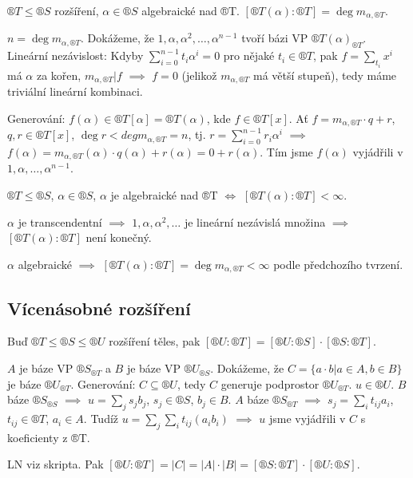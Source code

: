 \documentclass[12pt]{article}                   %
\begin{document}
        \begin{tvrzeni}
            $®T ≤ ®S$ rozšíření, $\alpha \in ®S$ algebraické nad ®T. $[®T(\alpha):®T] = \deg m_{\alpha, ®T}$.

            \begin{dukazin}
                $n = \deg m_{\alpha, ®T}$. Dokážeme, že $1, \alpha, \alpha^2, …, \alpha^{n-1}$ tvoří bázi VP $®T(\alpha)_{®T}$. Lineární nezávislost: Kdyby $\sum_{i=0}^{n-1}t_i\alpha^i = 0$ pro nějaké $t_i \in ®T$, pak $f = \sum_{t_i}x^i$ má $\alpha$ za kořen, $m_{\alpha, ®T} | f$ $\implies$ $f = 0$ (jelikož $m_{\alpha, ®T}$ má větší stupeň), tedy máme triviální lineární kombinaci.

                Generování: $f(\alpha) \in ®T[\alpha] = ®T(\alpha)$, kde $f \in ®T[x]$. Ať $f = m_{\alpha, ®T} · q + r$, $q, r \in ®T[x]$, $\deg r < deg m_{\alpha, ®T} = n$, tj. $r = \sum_{i = 0}^{n-1} r_i\alpha^i$ $\implies$ $f(\alpha) = m_{\alpha, ®T}(\alpha)·q(\alpha) + r(\alpha) = 0 + r(\alpha)$. Tím jsme $f(\alpha)$ vyjádřili v $1, \alpha, …, \alpha^{n-1}$.
            \end{dukazin}
        \end{tvrzeni}

        \begin{dusledek}
            $®T ≤ ®S$, $\alpha \in ®S$, $\alpha$ je algebraické nad ®T $\Leftrightarrow$ $[®T(\alpha):®T] < ∞$.

            \begin{dukazin}
                $\alpha$ je transcendentní $\implies$ $1, \alpha, \alpha^2, …$ je lineární nezávislá množina $\implies$ $[®T(\alpha):®T]$ není konečný.

                $\alpha$ algebraické $\implies$ $[®T(\alpha):®T] = \deg m_{\alpha, ®T} < ∞$ podle předchozího tvrzení.
            \end{dukazin}
        \end{dusledek}

    \subsection{Vícenásobné rozšíření}
        \begin{tvrzeni}
            Buď $®T ≤ ®S ≤ ®U$ rozšíření těles, pak $[®U:®T] = [®U:®S]·[®S:®T]$.

            \begin{dukazin}
                $A$ je báze VP $®S_{®T}$ a $B$ je báze VP $®U_{®S}$. Dokážeme, že $C = \{a·b | a \in A, b \in B\}$ je báze $®U_{®T}$. Generování: $C \subseteq ®U$, tedy $C$ generuje podprostor $®U_{®T}$. $u \in ®U$. $B$ báze $®S_{®S}$ $\implies$ $u = \sum_j s_jb_j$, $s_j \in ®S$, $b_j \in B$. $A$ báze $®S_{®T}$ $\implies$ $s_j = \sum_i t_{ij}a_i$, $t_{ij}\in ®T$, $a_i \in A$. Tudíž $u = \sum_j\sum_i t_{ij}(a_ib_i)$ $\implies$ $u$ jsme vyjádřili v $C$ s koeficienty z ®T.

                LN viz skripta. Pak $[®U:®T] = |C| = |A|·|B| = [®S:®T]·[®U:®S]$.
            \end{dukazin}
        \end{tvrzeni}
\end{document}
